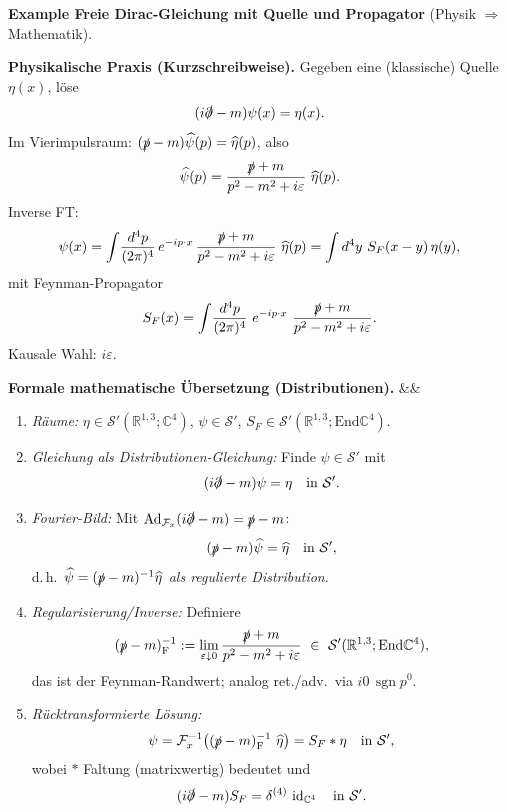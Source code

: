 \documentclass[10pt, letterpaper]{article}
\newcommand{\id}{\operatorname{id}}
\newcommand{\sgn}{\operatorname{sgn}}
\newcommand{\Ad}{\operatorname{Ad}}
\newcommand{\R}{\mathbb{R}}
\newcommand{\C}{\mathbb{C}}
\newcommand{\End}{\mathrm{End}}
\newenvironment{romanenum}[1][]
  {%
    \ifx&#1&
    \else
      \textbf{#1}\quad
    \fi
    \begin{enumerate}[label=\roman*)]
  }
  {%
    \end{enumerate}%
  }
\newcommand{\CustomHeading}[3]{%
  \par\medskip\noindent%
  \textbf{#1 #2} \textnormal{(#3)}.\enskip%
}
\newenvironment{EXA}[2]{\begin{unitbox}\CustomHeading{Example}{#1}{#2}}{\end{unitbox}}
\begin{document}
\begin{EXA}{Freie Dirac-Gleichung mit Quelle und Propagator}{Physik $\Rightarrow$ Mathematik}
\textbf{Physikalische Praxis (Kurzschreibweise).}
Gegeben eine (klassische) Quelle $\eta(x)$, löse
\[
(i\slashed{\partial}-m)\psi(x)=\eta(x).
\]
Im Vierimpulsraum: $(\slashed{p}-m)\widehat{\psi}(p)=\widehat{\eta}(p)$, also
\[
\widehat{\psi}(p)=\frac{\slashed{p}+m}{p^2-m^2+i\varepsilon}\ \widehat{\eta}(p).
\]
Inverse FT:
\[
\psi(x)=\int\!\frac{d^4p}{(2\pi)^4}\,e^{-ip\cdot x}\,
\frac{\slashed{p}+m}{p^2-m^2+i\varepsilon}\ \widehat{\eta}(p)
=\int d^4y\ S_F(x-y)\,\eta(y),
\]
mit Feynman-Propagator
\[
S_F(x)=\int\!\frac{d^4p}{(2\pi)^4}\ e^{-ip\cdot x}\ \frac{\slashed{p}+m}{p^2-m^2+i\varepsilon}.
\]
Kausale Wahl: $i\varepsilon$.

\medskip
\textbf{Formale mathematische Übersetzung (Distributionen).}
\begin{romanenum}
\item \emph{Räume:} $\eta\in\mathcal{S}'(\R^{1,3};\C^4)$, $\psi\in\mathcal{S}'$, $S_F\in\mathcal{S}'(\R^{1,3};\End\C^4)$.
\item \emph{Gleichung als Distributionen-Gleichung:} Finde $\psi\in\mathcal{S}'$ mit
\[
(i\slashed{\partial}-m)\psi=\eta\quad\text{in }\mathcal{S}'.
\]
\item \emph{Fourier-Bild:} Mit $\Ad_{\mathcal{F}_x}(i\slashed{\partial}-m)=\slashed{p}-m$:
\[
(\slashed{p}-m)\widehat{\psi}=\widehat{\eta}\quad\text{in }\mathcal{S}',
\]
d.\,h.\ $\widehat{\psi}= (\slashed{p}-m)^{-1}\widehat{\eta}$ \emph{als regulierte Distribution}.
\item \emph{Regularisierung/Inverse:} Definiere
\[
(\slashed{p}-m)^{-1}_{\mathrm{F}}
:=\lim_{\varepsilon\downarrow0}\frac{\slashed{p}+m}{p^2-m^2+i\varepsilon}
\ \in\ \mathcal{S}'(\R^{1,3};\End\C^4),
\]
das ist der Feynman-Randwert; analog ret./adv.\ via $i0\,\sgn p^0$.
\item \emph{Rücktransformierte Lösung:}
\[
\psi = \mathcal{F}_x^{-1}\big((\slashed{p}-m)^{-1}_{\mathrm{F}}\ \widehat{\eta}\big)
= S_F * \eta\quad\text{in }\mathcal{S}',
\]
wobei $*$ Faltung (matrixwertig) bedeutet und
\[
(i\slashed{\partial}-m)S_F=\delta^{(4)}\,\id_{\C^4}
\quad\text{in }\mathcal{S}'.
\]
\end{romanenum}
\end{EXA}


\end{document}

